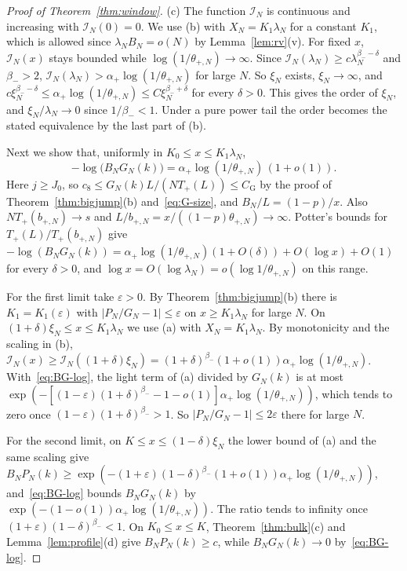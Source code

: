 \begin{proof}[Proof of Theorem~\ref{thm:window}]
(c) The function $\mathcal I_N$ is continuous and increasing with $\mathcal I_N(0)=0$. We use
(b) with $X_N=K_1\lambda_N$ for a constant $K_1$, which is allowed since
$\lambda_NB_N=o(N)$ by Lemma~\ref{lem:rv}(v). For fixed $x$, $\mathcal I_N(x)$ stays bounded
while $\log(1/\theta_{\plus,N})\to\infty$. Since $\mathcal I_N(\lambda_N)\ge c\lambda_N^{\beta_\minus-\delta}$
and $\beta_\minus>2$, $\mathcal I_N(\lambda_N)>\alpha_\plus\log(1/\theta_{\plus,N})$ for large $N$.
So $\xi_N$ exists, $\xi_N\to\infty$, and
$c\xi_N^{\beta_\minus-\delta}\le\alpha_\plus\log(1/\theta_{\plus,N})\le C\xi_N^{\beta_\minus+\delta}$
for every $\delta>0$. This gives the order of $\xi_N$, and $\xi_N/\lambda_N\to0$ since
$1/\beta_\minus<1$. Under a pure power tail the order becomes the stated equivalence by the
last part of (b).

Next we show that, uniformly in $K_0\le x\le K_1\lambda_N$,
\begin{equation}\label{eq:BG-log}
 -\log\bigl(B_NG_N(k)\bigr)=\alpha_\plus\log(1/\theta_{\plus,N})\,(1+o(1)) .
\end{equation}
Here $j\ge J_0$, so $c_8\le G_N(k)L/(NT_\plus(L))\le C_{\mathrm G}$ by the proof of
Theorem~\ref{thm:bigjump}(b) and~\eqref{eq:G-size}, and $B_N/L=(1-p)/x$. Also
$NT_\plus(b_{\plus,N})\to s$ and $L/b_{\plus,N}=x/((1-p)\theta_{\plus,N})\to\infty$. Potter's
bounds for $T_\plus(L)/T_\plus(b_{\plus,N})$ give
$-\log(B_NG_N(k))=\alpha_\plus\log(1/\theta_{\plus,N})(1+O(\delta))+O(\log x)+O(1)$ for every
$\delta>0$, and $\log x=O(\log\lambda_N)=o(\log1/\theta_{\plus,N})$ on this range.

For the first limit take $\varepsilon>0$. By Theorem~\ref{thm:bigjump}(b) there is
$K_1=K_1(\varepsilon)$ with $|P_N/G_N-1|\le\varepsilon$ on $x\ge K_1\lambda_N$ for large $N$. On
$(1+\delta)\xi_N\le x\le K_1\lambda_N$ we use (a) with $X_N=K_1\lambda_N$. By monotonicity and
the scaling in (b),
$\mathcal I_N(x)\ge\mathcal I_N((1+\delta)\xi_N)=(1+\delta)^{\beta_\minus}(1+o(1))\alpha_\plus\log(1/\theta_{\plus,N})$.
With~\eqref{eq:BG-log}, the light term of (a) divided by $G_N(k)$ is at most
$\exp(-[(1-\varepsilon)(1+\delta)^{\beta_\minus}-1-o(1)]\alpha_\plus\log(1/\theta_{\plus,N}))$, which
tends to zero once $(1-\varepsilon)(1+\delta)^{\beta_\minus}>1$. So $|P_N/G_N-1|\le2\varepsilon$
there for large $N$.

For the second limit, on $K\le x\le(1-\delta)\xi_N$ the lower bound of (a) and the same
scaling give
$B_NP_N(k)\ge\exp(-(1+\varepsilon)(1-\delta)^{\beta_\minus}(1+o(1))\alpha_\plus\log(1/\theta_{\plus,N}))$,
and~\eqref{eq:BG-log} bounds $B_NG_N(k)$ by
$\exp(-(1-o(1))\alpha_\plus\log(1/\theta_{\plus,N}))$. The ratio tends to infinity once
$(1+\varepsilon)(1-\delta)^{\beta_\minus}<1$. On $K_0\le x\le K$, Theorem~\ref{thm:bulk}(c) and
Lemma~\ref{lem:profile}(d) give $B_NP_N(k)\ge c$, while $B_NG_N(k)\to0$
by~\eqref{eq:BG-log}.
\end{proof}

